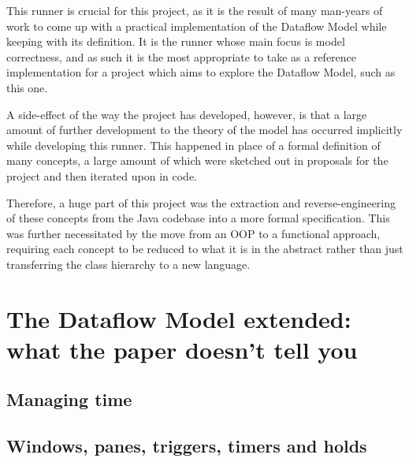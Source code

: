This runner is crucial for this project, as it is the result of many man-years of work to come up with a practical implementation of the Dataflow Model while keeping with its definition.
It is the runner whose main focus is model correctness, and as such it is the most appropriate to take as a reference implementation for a project which aims to explore the Dataflow Model, such as this one.

A side-effect of the way the project has developed, however, is that a large amount of further development to the theory of the model has occurred implicitly while developing this runner.
This happened in place of a formal definition of many concepts, a large amount of which were sketched out in proposals for the project and then iterated upon in code.

Therefore, a huge part of this project was the extraction and reverse-engineering of these concepts from the Java codebase into a more formal specification.
This was further necessitated by the move from an OOP to a functional approach, requiring each concept to be reduced to what it is in the abstract rather than just transferring the class hierarchy to a new language.



\section{The Dataflow Model extended: what the paper doesn't tell you}\label{sec:prep:dataflow_extra}


\subsection{Managing time}


\subsection{Windows, panes, triggers, timers and holds}


